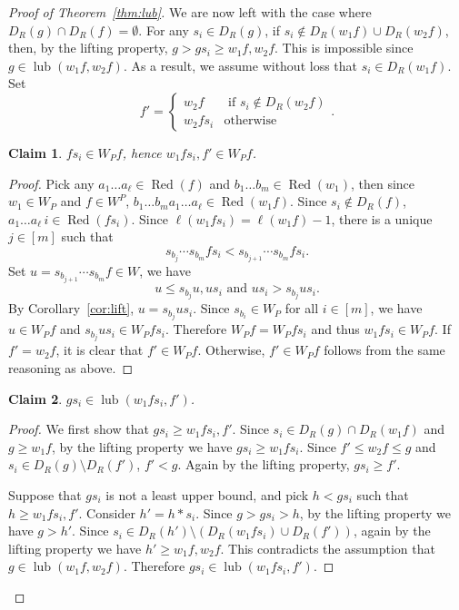\documentclass[10pt,a4paper]{amsart}
\newtheorem{claim}{Claim}
\newcommand{\Red}{\operatorname{Red}}
\newcommand{\lub}{\operatorname{lub}}
\begin{document}
\begin{proof}[Proof of Theorem~\ref{thm:lub}]
    We are now left with the case where $D_{R}(g) \cap D_{R}(f) = \emptyset$. For any $s_i\in D_{R}(g)$, if $s_i\notin D_{R}(w_1f)\cup D_{R}(w_2f)$, then, by the lifting property, $g>gs_i\geq w_1f,w_2f$. This is impossible since $g\in \lub(w_1f,w_2f)$. As a result, we assume without loss that $s_i\in D_{R}(w_1f)$. Set
    \[f' = \begin{cases}
        w_2f & \text{ if }s_i\notin D_{R}(w_2f)\\
        w_2fs_i & \text{otherwise}
    \end{cases}.\]
    \begin{claim}\label{claim:fsi}
        $fs_i\in W_P f$, hence $w_1fs_i,f'\in W_Pf$.
    \end{claim}
    \begin{proof}
        Pick any $a_1\dots a_{\ell}\in \Red(f)$ and $b_1\dots b_m\in \Red(w_1)$, then since $w_1\in W_P$ and $f\in W^P$, $b_1\dots b_m a_1\dots a_\ell \in \Red(w_1f)$. Since $s_i\notin D_{R}(f)$, $a_1\dots a_\ell\,  i \in \Red(fs_i)$. Since $\ell(w_1fs_i) = \ell(w_1f) - 1$, there is a unique $j\in [m]$ such that 
        \[s_{b_j}\cdots s_{b_m}fs_i< s_{b_{j+1}} \cdots s_{b_m}fs_i.\]
        Set $u = s_{b_{j+1}} \cdots s_{b_m}f\in W$, we have 
        \[u\leq s_{b_j}u, us_i\text{ and }us_i>s_{b_j}us_i.\]
        By Corollary~\ref{cor:lift}, $u = s_{b_j}us_{i}$. Since $s_{b_i}\in W_P$ for all $i\in [m]$, we have $u\in W_P f$ and $s_{b_j}us_i\in W_P fs_i$. 
        Therefore $W_Pf=W_Pfs_i$ and thus 
        $w_1fs_i\in W_P f$.
        If $f' = w_2f$, it is clear that $f'\in W_Pf$. Otherwise, $f'\in W_Pf$ follows from the same reasoning as above.
    \end{proof}
    
    \begin{claim}\label{claim:gsi}
         $gs_i\in \lub(w_1fs_i,f')$. 
    \end{claim}
    \begin{proof}
        We first show that $gs_i\geq w_1fs_i,f'$. Since $s_i\in D_{R}(g)\cap D_{R}(w_1f)$ and $g\geq w_1f$, by the lifting property we have $gs_i\geq w_1fs_i$. Since $f'\leq w_2f\leq g$ and $s_i\in D_{R}(g)\setminus D_{R}(f')$, $f'<g$.
        Again by the lifting property, $gs_i\geq f'$.
        

        Suppose that $gs_i$ is not a least upper bound, and pick $h<gs_i$ such that $h\geq w_1fs_i,f'$. Consider $h' = h\ast s_i$. Since $g>gs_i>h$, by the lifting property we have $g>h'$. Since $s_i\in D_{R}(h')\setminus (D_{R}(w_1fs_i)\cup D_{R}(f'))$, again by the lifting property we have $h'\geq w_1f,w_2f$. This contradicts the assumption that $g\in \lub(w_1f,w_2f)$. Therefore $gs_i\in \lub(w_1fs_i,f')$. 
    \end{proof}
    

\end{proof}
\end{document}
